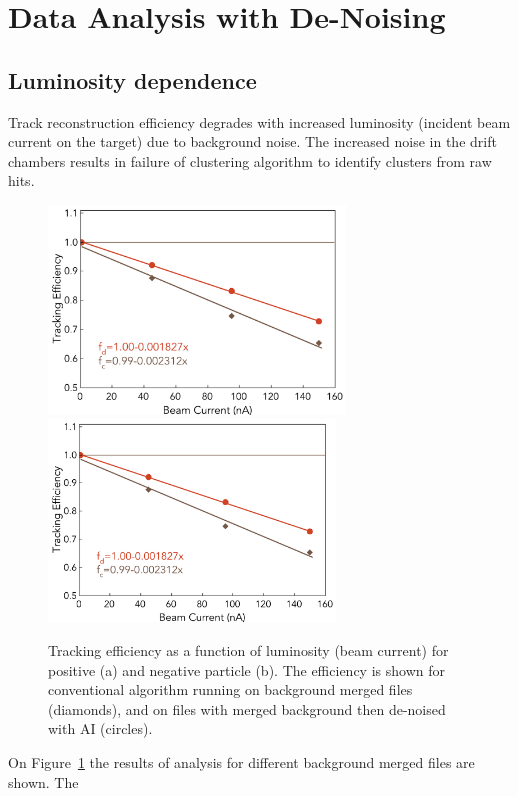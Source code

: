 \section{Data Analysis with De-Noising}

\subsection{Luminosity dependence}

Track reconstruction efficiency degrades with increased luminosity (incident beam current on the target) due to background
noise. The increased noise in the drift chambers results in failure of clustering algorithm to identify clusters from raw hits. 


\begin{figure}[!ht]
\begin{center}
 \includegraphics[width=3.1in]{images/figure_lscan_pos.pdf}
 \includegraphics[width=3in]{images/figure_lscan_pos.pdf}
\caption {Tracking efficiency as a function of luminosity (beam current) for positive (a) and negative particle (b).  The efficiency is shown for
conventional algorithm running on background merged files (diamonds), and on files with merged background then de-noised with AI (circles).}
 \label{lscan::conv_dn}
 \end{center}
\end{figure}

On Figure~\ref{lscan::conv_dn} the results of analysis for different background merged files are shown. The 

